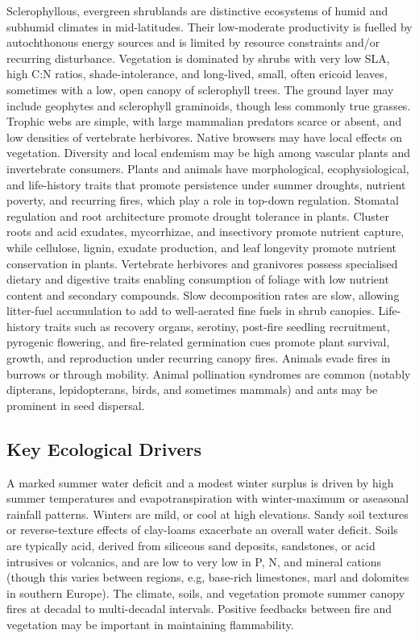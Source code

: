 \documentclass[
  letterpaper,
  DIV=11,
  numbers=noendperiod]{scrartcl}
\begin{document}
Sclerophyllous, evergreen shrublands are distinctive ecosystems of humid
and subhumid climates in mid-latitudes. Their low-moderate productivity
is fuelled by autochthonous energy sources and is limited by resource
constraints and/or recurring disturbance. Vegetation is dominated by
shrubs with very low SLA, high C:N ratios, shade-intolerance, and
long-lived, small, often ericoid leaves, sometimes with a low, open
canopy of sclerophyll trees. The ground layer may include geophytes and
sclerophyll graminoids, though less commonly true grasses. Trophic webs
are simple, with large mammalian predators scarce or absent, and low
densities of vertebrate herbivores. Native browsers may have local
effects on vegetation. Diversity and local endemism may be high among
vascular plants and invertebrate consumers. Plants and animals have
morphological, ecophysiological, and life-history traits that promote
persistence under summer droughts, nutrient poverty, and recurring
fires, which play a role in top-down regulation. Stomatal regulation and
root architecture promote drought tolerance in plants. Cluster roots and
acid exudates, mycorrhizae, and insectivory promote nutrient capture,
while cellulose, lignin, exudate production, and leaf longevity promote
nutrient conservation in plants. Vertebrate herbivores and granivores
possess specialised dietary and digestive traits enabling consumption of
foliage with low nutrient content and secondary compounds. Slow
decomposition rates are slow, allowing litter-fuel accumulation to add
to well-aerated fine fuels in shrub canopies. Life-history traits such
as recovery organs, serotiny, post-fire seedling recruitment, pyrogenic
flowering, and fire-related germination cues promote plant survival,
growth, and reproduction under recurring canopy fires. Animals evade
fires in burrows or through mobility. Animal pollination syndromes are
common (notably dipterans, lepidopterans, birds, and sometimes mammals)
and ants may be prominent in seed dispersal.

\subsection{Key Ecological Drivers}\label{key-ecological-drivers-80}

A marked summer water deficit and a modest winter surplus is driven by
high summer temperatures and evapotranspiration with winter-maximum or
aseasonal rainfall patterns. Winters are mild, or cool at high
elevations. Sandy soil textures or reverse-texture effects of clay-loams
exacerbate an overall water deficit. Soils are typically acid, derived
from siliceous sand deposits, sandstones, or acid intrusives or
volcanics, and are low to very low in P, N, and mineral cations (though
this varies between regions, e.g, base-rich limestones, marl and
dolomites in southern Europe). The climate, soils, and vegetation
promote summer canopy fires at decadal to multi-decadal intervals.
Positive feedbacks between fire and vegetation may be important in
maintaining flammability.
\end{document}

